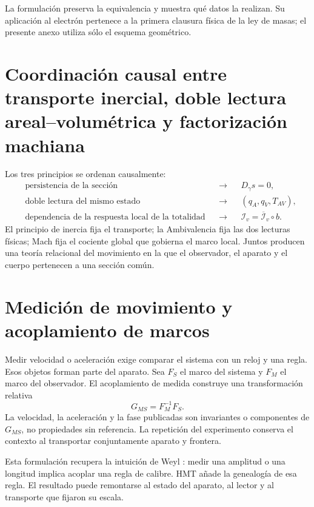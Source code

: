 La formulación preserva la equivalencia y muestra qué datos la realizan. Su
aplicación al electrón pertenece a la primera clausura física de la ley de
masas; el presente anexo utiliza sólo el esquema geométrico.

\section{Coordinación causal entre transporte inercial, doble lectura areal–volumétrica y factorización machiana}

Los tres principios se ordenan causalmente:
\begin{equation}
 \boxed{
 \begin{aligned}
 &\text{persistencia de la sección}
   &&\longrightarrow&& D_\gamma s=0,\\
 &\text{doble lectura del mismo estado}
   &&\longrightarrow&& (q_A,q_V,T_{AV}),\\
 &\text{dependencia de la respuesta local de la totalidad}
   &&\longrightarrow&& \mathcal I_v=\overline{\mathcal I}_v\circ b.
 \end{aligned}}
 \label{eq:triptico-inercia-mach}
\end{equation}
El principio de inercia fija el transporte; la Ambivalencia fija las dos
lecturas físicas; Mach fija el cociente global que gobierna el marco local.
Juntos producen una teoría relacional del movimiento en la que el observador,
el aparato y el cuerpo pertenecen a una sección común.

\section{Medición de movimiento y acoplamiento de marcos}

Medir velocidad o aceleración exige comparar el sistema con un reloj y una
regla. Esos objetos forman parte del aparato. Sea \(F_S\) el marco del sistema
y \(F_M\) el marco del observador. El acoplamiento de medida construye una
transformación relativa
\[
 G_{MS}=F_M^{-1}F_S.
\]
La velocidad, la aceleración y la fase publicadas son invariantes o
componentes de \(G_{MS}\), no propiedades sin referencia. La repetición del
experimento conserva el contexto al transportar conjuntamente aparato y
frontera.

Esta formulación recupera la intuición de Weyl \cite{Weyl1927}: medir una amplitud o una
longitud implica acoplar una regla de calibre. HMT añade la genealogía de esa
regla. El resultado puede remontarse al estado del aparato, al lector y al
transporte que fijaron su escala.


